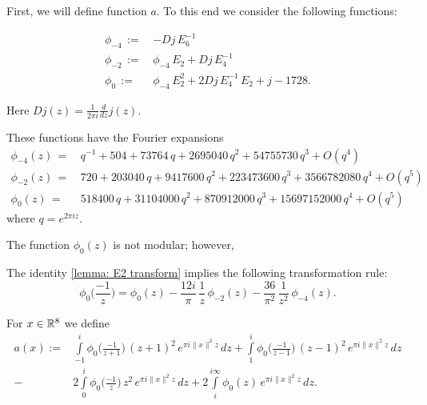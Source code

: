First, we will define function $a$. To this end we consider the following functions:
\begin{definition}\label{def: phi4 phi2 phi0}
\begin{align}
  \phi_{-4}\,:= \,& -Dj\,E_6^{-1}\label{eqn: def phi4}\\
  \phi_{-2}\,:= \,&\phi_{-4}\,E_2+Dj\,E_4^{-1}\label{eqn: def phi2}\\
  \phi_{0}\,:= \,&\phi_{-4}\,E_2^2+2Dj\,E_4^{-1}\,E_2+j-1728.\label{eqn: def phi0}
\end{align}
\end{definition}
Here $Dj(z)=\frac{1}{2\pi i} \frac{d}{dz} j(z)$.
\begin{lemma}\label{lemma: phi fourier4 phi fourier2 phi fourier0}
  These functions have the Fourier expansions
\begin{align}
  \phi_{-4}(z)\,=\,&q^{-1} + 504 + 73764\, q + 2695040\, q^2 + 54755730\, q^3 + O(q^4)\label{eqn: phi fourier4}\\
  \phi_{-2}(z)\,=\,&720 + 203040\, q + 9417600\, q^2 + 223473600\, q^3 + 3566782080\, q^4+O(q^5)\label{eqn: phi fourier2}\\
  \phi_{0}(z)\,=\,&518400\, q + 31104000\, q^2 + 870912000\, q^3 + 15697152000\, q^4+O(q^5)\label{eqn: phi fourier0}
\end{align}
where $q=e^{2\pi i z}$.
\end{lemma}
The function $\phi_0(z)$ is not modular; however,
\begin{lemma}\label{lemma: phi0 transform}
  The identity \ref{lemma: E2 transform} implies the following transformation rule:
\begin{equation}\label{eqn: phi0 transform}
\phi_0\Big(\frac{-1}{z}\Big)=\phi_0(z)-\frac{12i}{\pi}\,\frac{1}{z}\,\phi_{-2}(z)-\frac{36}{\pi^2}\,\frac{1}{z^2}\,\phi_{-4}(z).
\end{equation}
\end{lemma}
\begin{definition}\label{def: a(r) definition}
For $x\in\mathbb{R}^8$ we define
\begin{align}\label{eqn: a(r) definition}
  a(x):=&\int\limits_{-1}^i\phi_0\Big(\frac{-1}{z+1}\Big)\,(z+1)^2\,e^{\pi i \|x\|^2 z}\,dz
  +\int\limits_{1}^i\phi_0\Big(\frac{-1}{z-1}\Big)\,(z-1)^2\,e^{\pi i \|x\|^2 z}\,dz\\
  -&2\int\limits_{0}^i\phi_0\Big(\frac{-1}{z}\Big)\,z^2\,e^{\pi i \|x\|^2 z}\,dz
  +2\int\limits_{i}^{i\infty}\phi_0(z)\,e^{\pi i \|x\|^2 z}\,dz.\nonumber
\end{align}
\end{definition}

